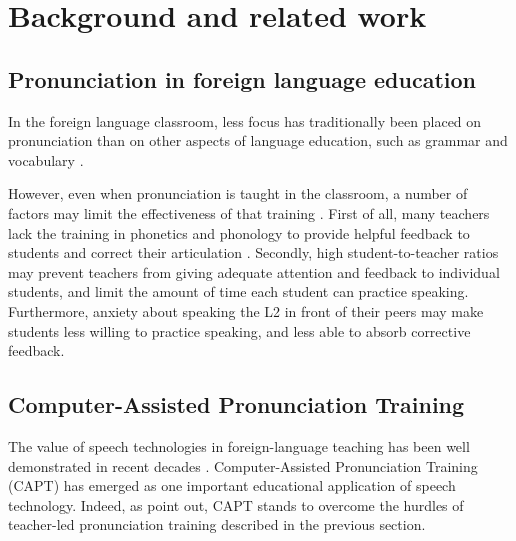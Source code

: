 %
%
\chapter{Background and related work}
\label{chap:background}



\section{Pronunciation in foreign language education}
\label{sec:bkgd:pron}

\citep{Derwing2005,Dlaska2013,Hirschfeld2007,Mehlhorn2005}

In the foreign language classroom, less focus has traditionally been placed on pronunciation than on other aspects of language education, such as grammar and vocabulary \citep{Neri2002}.

However, even when pronunciation is taught in the classroom, a number of factors may limit the effectiveness of that training \citep{Neri2002}. First of all, many teachers lack the training in phonetics and phonology to provide helpful feedback to students and correct their articulation . Secondly, high student-to-teacher ratios may prevent teachers from giving adequate attention and feedback to individual students, and limit the amount of time each student can practice speaking. Furthermore, anxiety about speaking the L2 in front of their peers may make students less willing to practice speaking, and less able to absorb corrective feedback.



\section{Computer-Assisted Pronunciation Training} %
\label{sec:bkgd:capt}

	The value of speech technologies in foreign-language teaching has been well demonstrated in recent decades \citep{Neri2002,Eskenazi2009,Delmonte2011,Witt2012}. Computer-Assisted Pronunciation Training (CAPT) has emerged as one important educational application of speech technology. Indeed, as \textcite{Neri2002} point out, CAPT stands to overcome the hurdles of teacher-led pronunciation training described in the previous section.
	
